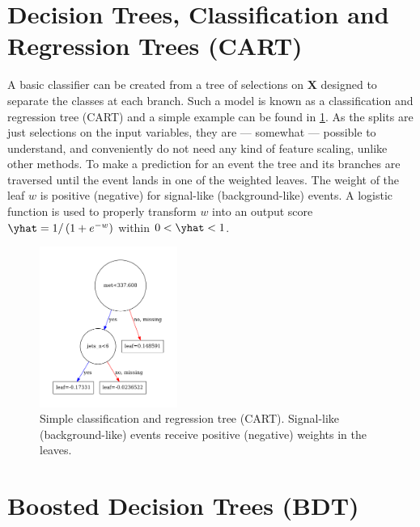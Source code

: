 \section{Decision Trees, \texorpdfstring{\ie}{ie} Classification and Regression Trees (CART)}
\label{ml:supervised:CART}

A basic classifier can be created from a tree of selections on $\mathbf{X}$ designed to
separate the classes at each branch.
Such a model is known as a classification and regression tree (CART) \cite{Breiman:2253780}
and a simple example can be found in \cref{ml:supervised:CART:small_example_CART}.
As the splits are just selections on the input variables,
they are --- somewhat --- possible to understand,
and conveniently do not need any kind of feature scaling, unlike other methods.
To make a prediction for an event the tree and its branches are traversed
until the event lands in one of the weighted leaves.
The weight of the leaf $w$ is positive (negative) for signal-like (background-like) events.
A logistic function is used to properly transform $w$ into an output score
$\yhat = 1 /\left(1+e^{-w}\right)$ within $0 < \yhat < 1$.

\begin{figure}[H]
\centering
\includegraphics[width=0.4\textwidth]{figures/ml/tree7_g2000_n1200.pdf}
\caption{
Simple classification and regression tree (CART).
Signal-like (background-like) events receive positive (negative) weights in the leaves.
}
\label{ml:supervised:CART:small_example_CART}
\end{figure}


\section{Boosted Decision Trees (BDT)}
\label{ml:supervised:BDT}

